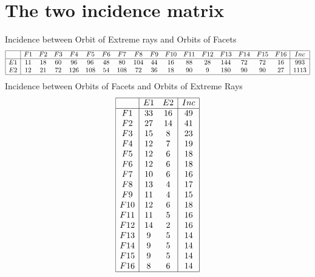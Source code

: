 \documentclass[12pt]{article}
\begin{document}
\section{The two incidence matrix}
Incidence between Orbit of Extreme rays and Orbits of Facets
\begin{equation*}
\begin{array}{|c|cccccccccccccccc|c|}
\hline
&F1&F2&F3&F4&F5&F6&F7&F8&F9&F10&F11&F12&F13&F14&F15&F16&Inc\\
\hline
E1&11&18&60&96&96&48&80&104&44&16&88&28&144&72&72&16&993\\
E2&12&21&72&126&108&54&108&72&36&18&90&9&180&90&90&27&1113\\
\hline
\end{array}
\end{equation*}
Incidence between Orbits of Facets and Orbits of Extreme Rays
\begin{equation*}
\begin{array}{|c|cc|c|}
\hline
&E1&E2&Inc\\
\hline
F1&33&16&49\\
F2&27&14&41\\
F3&15&8&23\\
F4&12&7&19\\
F5&12&6&18\\
F6&12&6&18\\
F7&10&6&16\\
F8&13&4&17\\
F9&11&4&15\\
F10&12&6&18\\
F11&11&5&16\\
F12&14&2&16\\
F13&9&5&14\\
F14&9&5&14\\
F15&9&5&14\\
F16&8&6&14\\
\hline
\end{array}
\end{equation*}
\end{document}
